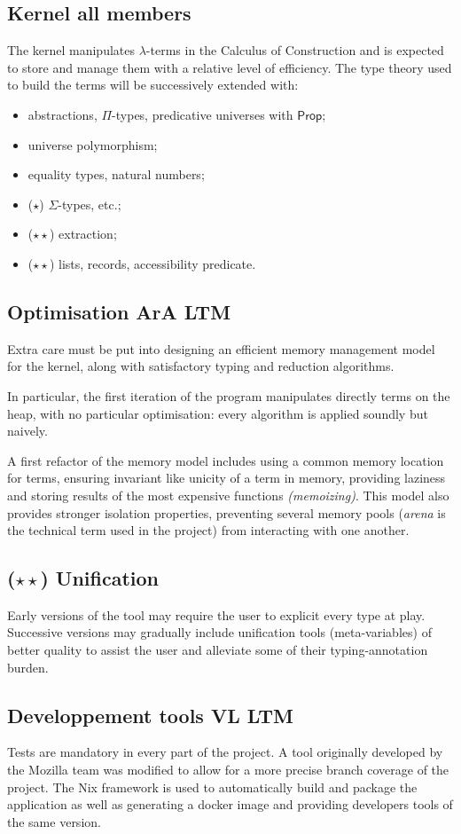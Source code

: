 \documentclass[twocolumn]{article}
\newcommand{\members}[1]{\texorpdfstring{\hfill\scriptsize #1}{}}
\newcommand{\etun}{{\color{Green} ($\star$)} }
\newcommand{\etde}{{\color{Orange} ($\star\star$)} }
\begin{document}
\subsection{Kernel \members{all members}}
The kernel manipulates
\(\lambda\)-terms in the Calculus of Construction and is expected to store and
manage them with a relative level of efficiency. The type theory used to build
the terms will be successively extended with:
\begin{itemize}
  \item abstractions, \(\Pi\)-types, predicative universes with \(\mathsf{Prop}\);
  \item universe polymorphism;
	\item equality types, natural numbers;
  \item \etun \(\Sigma\)-types, etc.;
  \item \etde extraction;
  \item \etde lists, records, accessibility predicate.
\end{itemize}


\subsection{Optimisation \members{ArA LTM}}
Extra care must be put into designing an efficient memory management model for
the kernel, along with satisfactory typing and reduction algorithms.

In particular, the first iteration of the program manipulates directly terms on
the heap, with no particular optimisation: every algorithm is applied soundly
but naively.

A first refactor of the memory model includes using a common memory location for
terms, ensuring invariant like unicity of a term in memory, providing laziness
and storing results of the most expensive functions \emph{(memoizing)}. This
model also provides stronger isolation properties, preventing several memory
pools (\emph{arena} is the technical term used in the project) from interacting
with one another.

\subsection{\etde Unification}\label{sec:unification}
Early versions of the tool may require the user to explicit every type at play.
Successive versions may gradually include unification tools (meta-variables) of
better quality to assist the user and alleviate some of their typing-annotation
burden.

\subsection{Developpement tools \members{VL LTM}}
Tests are mandatory in every part of the project. A tool originally developed by
the Mozilla team was modified to allow for a more precise branch coverage of the
project. The Nix framework is used to automatically build and package the
application as well as generating a docker image and providing developers tools
of the same version.

\end{document}
